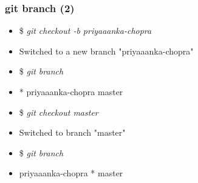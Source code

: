 \documentclass[10pt]{beamer}
\newcommand{\command}[1]{\textsl{\textit{#1}}}
\begin{document}
%
%

\begin{frame}[fragile]
\frametitle{git branch (2)}

\begin{block}{}
\scriptsize
\begin{semiverbatim}
\begin{itemize}[<+-| alert@+>]
\item[]{\$ \command{git checkout -b priyaaanka-chopra}}
\item[]{Switched to a new branch "priyaaanka-chopra"}

\item[]{\$ \command{git branch}}
\item[]{* priyaaanka-chopra
  master}

\item[]{\$ \command{git checkout master}}
\item[]{Switched to branch "master"}

\item[]{\$ \command{git branch}}
\item[]{  priyaaanka-chopra
* master}
\end{itemize}
\end{semiverbatim}
\end{block}

\end{frame}

%
%
\end{document}
